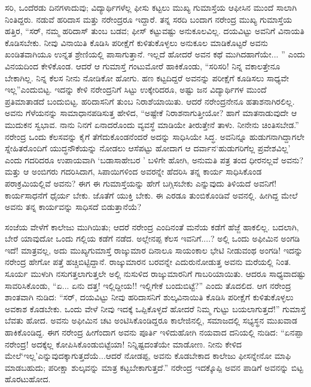 ಸರಿ, ಒಂದೆರಡು ದಿನಗಳಾದುವು; ವಿದ್ಯಾರ್ಥಿಗಳೆಲ್ಲ ಫೀಸು ಕಟ್ಟಲು ಮುಖ್ಯ ಗುಮಾಸ್ತೆಯ ಆಫೀಸಿನ ಮುಂದೆ ಸಾಲಾಗಿ ನಿಂತಿದ್ದರು. ನಡುವೆ ಹರಿದಾಸ ಮತ್ತು ನರೇಂದ್ರರೂ ಇದ್ದಾರೆ. ತನ್ನ ಸರದಿ ಬಂದಾಗ ನರೇಂದ್ರ ಮುಖ್ಯ ಗುಮಾಸ್ತೆಯ ಹತ್ತಿರ, “ಸರ್, ನಮ್ಮ ಹರಿದಾಸ್ ತುಂಬ ಬಡವ; ಫೀಸ್ ಕಟ್ಟುವಷ್ಟು ಅನುಕೂಲವಿಲ್ಲ. ದಯವಿಟ್ಟು ಅವನಿಗೆ ವಿನಾಯತಿ ಕೊಡಿಸಬೇಕು. ನೀವು ವಿನಾಯಿತಿ ಕೊಡಿಸಿ ಪರೀಕ್ಷೆಗೆ ಕುಳಿತುಕೊಳ್ಳಲು ಅನುಕೂಲ ಮಾಡಿಕೊಟ್ಟರೆ ಅವನು ಖಂಡಿತವಾಗಿಯೂ ಉನ್ನತ ಶ್ರೇಣಿಯಲ್ಲಿ ಪಾಸಾಗುತ್ತಾನೆ. ಇಲ್ಲದೆ ಹೋದರೆ ಅವನ ಕಥೆ ಮುಗಿದಹಾಗೆಯೇ... ” ಎಂದು ವಿನಯದಿಂದ ಕೇಳಿಕೊಂಡ. ಆದರೆ ಆ ಗುಮಾಸ್ತೆ ಗಂಟುಮೋರೆ ಹಾಕಿಕೊಂಡು, “ಸರಿಸರಿ! ನಿನ್ನ ವಕಾಲತ್ತೇನೂ ಬೇಕಾಗಿಲ್ಲ. ನಿನ್ನ ಕೆಲಸ ನೀನು ನೋಡಿಕೋ ಹೋಗು. ಹಣ ಕಟ್ಟದಿದ್ದರೆ ಅವನನ್ನು ಪರೀಕ್ಷೆಗೆ ಕೂಡಿಸಲು ಸಾಧ್ಯವೇ ಇಲ್ಲ”ಎಂದುಬಿಟ್ಟ. ಇದನ್ನು ಕೇಳಿ ನರೇಂದ್ರನಿಗೆ ಸಿಟ್ಟು ಉಕ್ಕೇರಿದರೂ, ಅಷ್ಟು ಜನ ವಿದ್ಯಾರ್ಥಿಗಳ ಮುಂದೆ ಪ್ರತಿಮಾತಾಡದೆ ಬಂದುಬಿಟ್ಟ. ಹರಿದಾಸನಿಗೆ ತುಂಬ ನಿರಾಶೆಯಾಯಿತು. ಆದರೆ ನರೇಂದ್ರನೇನೂ ಹತಾಶನಾಗಿರಲಿಲ್ಲ. ಅವನು ಗೆಳೆಯನನ್ನು ಸಾಮಾಧಾನಪಡಿಸುತ್ತ ಹೇಳಿದ, “ಅಷ್ಟೇಕೆ ನಿರಾಶನಾಗುತ್ತೀಯೋ? ಹಾಗೆ ಮಾತನಾಡುವುದೇ ಆ ಮುದುಕನ ಸ್ವಭಾವ. ನಾನು ನಿನಗೆ ಏನಾದರೊಂದು ವ್ಯವಸ್ಥೆ ಮಾಡಿಯೇ ತೀರುತ್ತೇನೆ ತಾಳು. ನೀನೇನು ಚಿಂತಿಸಬೇಡ.” ನರೇಂದ್ರ ಒಂದು ಕೆಲಸವನ್ನು ಕೈಗೆ ತೆಗೆದುಕೊಂಡನೆಂದರೆ ಅದನ್ನು ಸಾಧಿಸಿಯೇ ಸಿದ್ಧ. ಅವನಿನ್ನೂ ಹುಡುಗನಾಗಿದ್ದಾಗಲೇ ಸ್ನೇಹಿತರೊಂದಿಗೆ ಯುದ್ಧನೌಕೆಯನ್ನು ನೋಡಲು ಆಸೆಪಟ್ಟು ಹೋದಾಗ ಆ ದರ್ವಾನ‘ಹುಡುಗರಿಗೆಲ್ಲ ಪ್ರವೇಶವಿಲ್ಲ’ ಎಂದು ಗದರಿದರೂ ಉಪಾಯವಾಗಿ ‘ಬಡಾಸಾಹೇಬರ ’ ಬಳಿಗೇ ಹೋಗಿ, ಅನುಮತಿ ಪತ್ರ ತಂದ ಧೀರನಲ್ಲವೆ ಅವನು? ಮತ್ತು ಆ ಅಂಬಿಗರು ಗದರಿಸಿದಾಗ, ಸಿಪಾಯಿಗಳಿಂದ ಅವರನ್ನೇ ಹೆದರಿಸಿ ತನ್ನ ಕಾರ್ಯ ಸಾಧಿಸಿಕೊಂಡ ಪರಾಕ್ರಮಿಯಲ್ಲಿವೆ ಅವನು? ಈಗ ಈ ಗುಮಾಸ್ತೆಯನ್ನು ಹೇಗೆ ಬಗ್ಗಿಸಬೇಕು ಎನ್ನುವುದು ತಿಳಿಯದೆ ಅವನಿಗೆ! ಕಾರ್ಯಸಾಧನೆಗೆ ಧೈರ್ಯ ಬೇಕು. ಜೊತೆಗೆ ಯುಕ್ತಿ ಬೇಕು. ಈ ಎರಡೂ ತುಂಬಿಕೊಂಡಿವೆ ಅವನಲ್ಲಿ. ಹೀಗಿದ್ದ ಮೇಲೆ ಅವನು ತನ್ನ ಕಾರ್ಯವನ್ನು ಸಾಧಿಸದೆ ಬಿಡುತ್ತಾನೆಯೆ?

ಸಂಜೆಯ ವೇಳೆಗೆ ಕಾಲೇಜು ಮುಗಿಯಿತು; ಆದರೆ ನರೇಂದ್ರ ಎಂದಿನಂತೆ ಮನೆಯ ಕಡೆಗೆ ಹೆಜ್ಜೆ ಹಾಕಲಿಲ್ಲ. ಬದಲಾಗಿ, ಬೇರೆ ಯಾವುದೋ ಒಂದು ಗಲ್ಲಿಯ ಕಡೆಗೆ ನಡೆದ. ಅಲ್ಲೇನಪ್ಪ ಕೆಲಸ ಇವನಿಗೆ....? ಅಲ್ಲಿ ಒಂದು ಅಫೀಮಿನ ಅಂಗಡಿ ಇದೆ! ಮಾತ್ರವಲ್ಲ, ಅದು ಮುಖ್ಯಗುಮಾಸ್ತೆ ರಾಜ್ಕುಮಾರ ದಿನಾಲೂ ಸಾಯಂಕಾಲ ಭೇಟಿ ನೀಡುವಂಥ ಅಂಗಡಿ! ಇದನ್ನು ನರೇಂದ್ರ ಹೇಗೋ ಪತ್ತೆ ಹಚ್ಚಿಬಿಟ್ಟಿದ್ದಾನೆ. ರಾಜ್ಕುಮಾರನ ಬರವನ್ನೇ ಎದುರುನೋಡುತ್ತ ಅವನು ಮರೆಯಲ್ಲಿ ನಿಂತ. ಸೂರ್ಯ ಮುಳುಗಿ ನಸುಗತ್ತಲಾಗುತ್ತಲೇ ಅಲ್ಲಿ ನುಸುಳಿದ ರಾಜ್ಕುಮಾರನಿಗೆ ಗಾಬರಿಯಾಯಿತು. ಆದರೂ ಸಾಧ್ಯವಾದಷ್ಟು ಸಾವರಿಸಿಕೊಂಡು, “ಏ... ಏನು ದತ್ತ! ಇಲ್ಲಿದ್ದೀಯ!! ಇಲ್ಲಿಗೇಕೆ ಬಂದುಬಿಟ್ಟೆ?” ಎಂದು ತೊದಲಿದ. ಆಗ ನರೇಂದ್ರ ಶಾಂತವಾಗಿ ನುಡಿದ: “ಸರ್, ದಯವಿಟ್ಟು ನೀವು ಹರಿದಾಸನಿಗೆ ಶುಲ್ಕವಿನಾಯಿತಿ ಕೊಡಿಸಿ ಪರೀಕ್ಷೆಗೆ ಕುಳಿತುಕೊಳ್ಳಲು ಅವಕಾಶ ಕೊಡಬೇಕು. ಒಂದು ವೇಳೆ ನೀವು ಇದಕ್ಕೆ ಒಪ್ಪಿಕೊಳ್ಳದೆ ಹೋದರೆ ನಿಮ್ಮ ಗುಟ್ಟು ಬಯಲಾಗುತ್ತದೆ!” ಗುಮಾಸ್ತೆ ಬೆವತು ಹೋದ. ಅವನು ಅಫೀಮಿನ ಚಟ ಅಂಟಿಸಿಕೊಂಡಿದ್ದರೂ ಕಾಲೇಜಿನಲ್ಲಿ, ಸಮಾಜದಲ್ಲಿ ಸಭ್ಯಸ್ಥನ ಮುಖವಾಡ ಹಾಕಿಕೊಂಡಿದ್ದ. ಈಗ ನರೇಂದ್ರ ಹೀಗೆಂದಾಗ ಅವನು ಪೂರ್ತಿ ಇಳಿದುಹೋಗಿ ನಯವಾದ ದನಿಯಲ್ಲಿ ನುಡಿದ: “ಏನಪ್ಪಾ ನರೇಂದ್ರ! ಅದಕ್ಕೆಲ್ಲ ಕೋಪಿಸಿಕೊಂಡುಬಿಟ್ಟೆಯಾ! ನಿನ್ನಿಷ್ಟದಂತೆಯೇ ಮಾಡೋಣ. ನೀನು ಕೇಳಿದ ಮೇಲೆ‘ಇಲ್ಲ’ಎನ್ನುವುದಕ್ಕಾಗುತ್ತದೆಯೆ...ಆದರೆ ನೋಡಪ್ಪ, ಅವನು ಕೊಡಬೇಕಾದ ಕಾಲೇಜು ಫೀಸನ್ನೇನೋ ಮಾಫಿ ಮಾಡಬಹುದು; ಪರೀಕ್ಷಾ ಶುಲ್ಕವನ್ನು ಮಾತ್ರ ಕಟ್ಟಬೇಕಾಗುತ್ತದೆ.” ನರೇಂದ್ರ ಇದಕ್ಕೊಪ್ಪಿ ಅವನ ಪಾಡಿಗೆ ಅವನನ್ನು ಬಿಟ್ಟ ಹೊರಟುಹೋದ.


